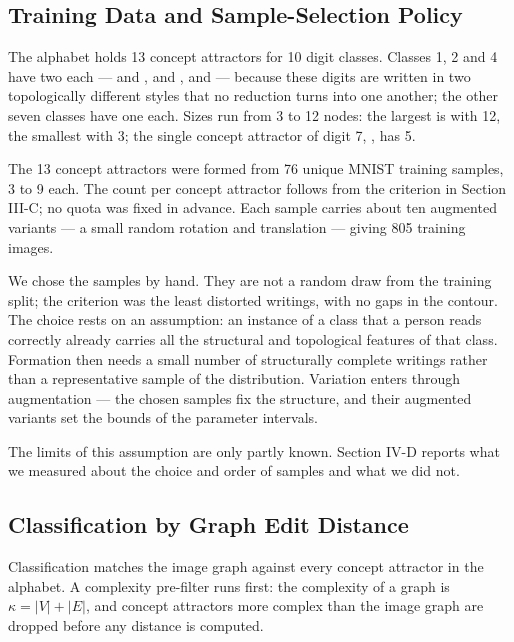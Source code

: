 \subsection{Training Data and Sample-Selection Policy}

The alphabet holds 13 concept attractors for 10 digit classes. Classes 1, 2 and 4 have two each ---  and ,  and ,  and  --- because these digits are written in two topologically different styles that no reduction turns into one another; the other seven classes have one each. Sizes run from 3 to 12 nodes: the largest is  with 12, the smallest  with 3; the single concept attractor of digit 7, , has 5.

The 13 concept attractors were formed from 76 unique MNIST \cite{lecun1998} training samples, 3 to 9 each. The count per concept attractor follows from the criterion in Section III-C; no quota was fixed in advance. Each sample carries about ten augmented variants --- a small random rotation and translation --- giving 805 training images.

We chose the samples by hand. They are not a random draw from the training split; the criterion was the least distorted writings, with no gaps in the contour. The choice rests on an assumption: an instance of a class that a person reads correctly already carries all the structural and topological features of that class. Formation then needs a small number of structurally complete writings rather than a representative sample of the distribution. Variation enters through augmentation --- the chosen samples fix the structure, and their augmented variants set the bounds of the parameter intervals.

The limits of this assumption are only partly known. Section IV-D reports what we measured about the choice and order of samples and what we did not.

\subsection{Classification by Graph Edit Distance}

Classification matches the image graph against every concept attractor in the alphabet. A complexity pre-filter runs first: the complexity of a graph is $\kappa = |V| + |E|$, and concept attractors more complex than the image graph are dropped before any distance is computed.

